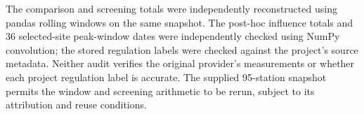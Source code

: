 The comparison and screening totals were independently reconstructed using pandas rolling windows on the same snapshot. The post-hoc influence totals and 36 selected-site peak-window dates were independently checked using NumPy convolution; the stored regulation labels were checked against the project's source metadata. Neither audit verifies the original provider's measurements or whether each project regulation label is accurate. The supplied 95-station snapshot permits the window and screening arithmetic to be rerun, subject to its attribution and reuse conditions.
